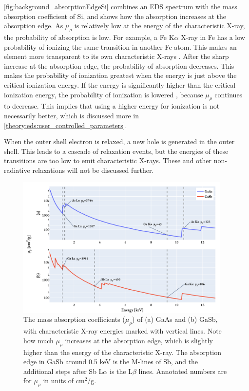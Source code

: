 \cref{fig:background_absorptionEdgeSi} combines an EDS spectrum with the mass absorption coefficient of Si, and shows how the absorption increases at the absorption edge.
As $\mu_\rho$ is relatively low at the energy of the characteristic X-ray, the probability of absorption is low.
For example, a Fe K$\alpha$ X-ray in Fe has a low probability of ionizing the same transition in another Fe atom.
This makes an element more transparent to its own characteristic X-rays \cite[Ch. 4.4]{goldstein_scanning_2018}.
After the sharp increase at the absorption edge, the probability of absorption decreases.
This makes the probability of ionization greatest when the energy is just above the critical ionization energy.
If the energy is significantly higher than the critical ionization energy, the probability of ionization is lowered \cite[p. 78]{curry_radiology_k_absorption}, because $\mu_\rho$ continues to decrease.
This implies that using a higher energy for ionization is not necessarily better, which is discussed more in \cref{theory:eds:user_controlled_parameters}.


When the outer shell electron is relaxed, a new hole is generated in the outer shell.
This leads to a cascade of relaxation events, but the energies of these transitions are too low to emit characteristic X-rays.
These and other non-radiative relaxations will not be discussed further.


\begin{figure}[phtb]
    \centering
    \includegraphics[width=0.95\textwidth]{figures/mass_absorption_coefficients.pdf}
    \caption{
        The mass absorption coefficients ($\mu_\rho$) of (a) GaAs and (b) GaSb, with characteristic X-ray energies marked with vertical lines.
        Note how much $\mu_\rho$ increases at the absorption edge, which is slightly higher than the energy of the characteristic X-ray.
        The absorption edge in GaSb around 0.5 keV is the M-lines of Sb, and the additional steps after Sb L$\alpha$ is the L$\beta$ lines.
        Annotated numbers are for $\mu_\rho$ in units of cm$^2$/g.
    }
    \label{fig:mass_absorption_coefficients}
\end{figure}


